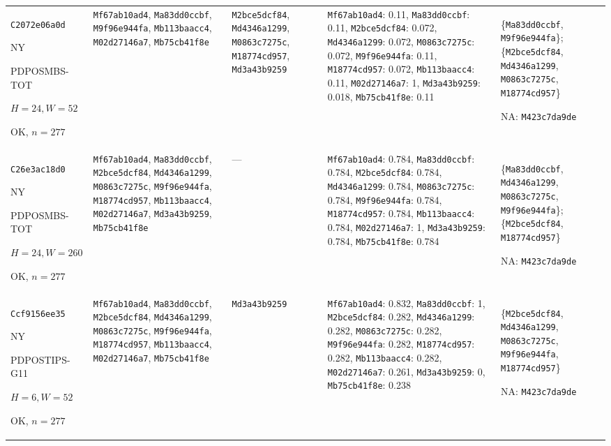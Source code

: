 \begin{longtable}{p{.15\linewidth}p{.17\linewidth}p{.17\linewidth}p{.25\linewidth}p{.14\linewidth}}
\texttt{C2072e06a0d}\par NY\par PDPOSMBS-\allowbreak{}TOT\par $H=24,W=52$\par OK, $n=277$ & \texttt{Mf67ab10ad4}, \texttt{Ma83dd0ccbf}, \texttt{M9f96e944fa}, \texttt{Mb113baacc4}, \texttt{M02d27146a7}, \texttt{Mb75cb41f8e} & \texttt{M2bce5dcf84}, \texttt{Md4346a1299}, \texttt{M0863c7275c}, \texttt{M18774cd957}, \texttt{Md3a43b9259} & \texttt{Mf67ab10ad4}: 0.11, \texttt{Ma83dd0ccbf}: 0.11, \texttt{M2bce5dcf84}: 0.072, \texttt{Md4346a1299}: 0.072, \texttt{M0863c7275c}: 0.072, \texttt{M9f96e944fa}: 0.11, \texttt{M18774cd957}: 0.072, \texttt{Mb113baacc4}: 0.11, \texttt{M02d27146a7}: 1, \texttt{Md3a43b9259}: 0.018, \texttt{Mb75cb41f8e}: 0.11 & \{\texttt{Ma83dd0ccbf}, \texttt{M9f96e944fa}\}; \{\texttt{M2bce5dcf84}, \texttt{Md4346a1299}, \texttt{M0863c7275c}, \texttt{M18774cd957}\}\par NA: \texttt{M423c7da9de} \\
\texttt{C26e3ac18d0}\par NY\par PDPOSMBS-\allowbreak{}TOT\par $H=24,W=260$\par OK, $n=277$ & \texttt{Mf67ab10ad4}, \texttt{Ma83dd0ccbf}, \texttt{M2bce5dcf84}, \texttt{Md4346a1299}, \texttt{M0863c7275c}, \texttt{M9f96e944fa}, \texttt{M18774cd957}, \texttt{Mb113baacc4}, \texttt{M02d27146a7}, \texttt{Md3a43b9259}, \texttt{Mb75cb41f8e} & --- & \texttt{Mf67ab10ad4}: 0.784, \texttt{Ma83dd0ccbf}: 0.784, \texttt{M2bce5dcf84}: 0.784, \texttt{Md4346a1299}: 0.784, \texttt{M0863c7275c}: 0.784, \texttt{M9f96e944fa}: 0.784, \texttt{M18774cd957}: 0.784, \texttt{Mb113baacc4}: 0.784, \texttt{M02d27146a7}: 1, \texttt{Md3a43b9259}: 0.784, \texttt{Mb75cb41f8e}: 0.784 & \{\texttt{Ma83dd0ccbf}, \texttt{Md4346a1299}, \texttt{M0863c7275c}, \texttt{M9f96e944fa}\}; \{\texttt{M2bce5dcf84}, \texttt{M18774cd957}\}\par NA: \texttt{M423c7da9de} \\
\texttt{Ccf9156ee35}\par NY\par PDPOSTIPS-\allowbreak{}G11\par $H=6,W=52$\par OK, $n=277$ & \texttt{Mf67ab10ad4}, \texttt{Ma83dd0ccbf}, \texttt{M2bce5dcf84}, \texttt{Md4346a1299}, \texttt{M0863c7275c}, \texttt{M9f96e944fa}, \texttt{M18774cd957}, \texttt{Mb113baacc4}, \texttt{M02d27146a7}, \texttt{Mb75cb41f8e} & \texttt{Md3a43b9259} & \texttt{Mf67ab10ad4}: 0.832, \texttt{Ma83dd0ccbf}: 1, \texttt{M2bce5dcf84}: 0.282, \texttt{Md4346a1299}: 0.282, \texttt{M0863c7275c}: 0.282, \texttt{M9f96e944fa}: 0.282, \texttt{M18774cd957}: 0.282, \texttt{Mb113baacc4}: 0.282, \texttt{M02d27146a7}: 0.261, \texttt{Md3a43b9259}: 0, \texttt{Mb75cb41f8e}: 0.238 & \{\texttt{M2bce5dcf84}, \texttt{Md4346a1299}, \texttt{M0863c7275c}, \texttt{M9f96e944fa}, \texttt{M18774cd957}\}\par NA: \texttt{M423c7da9de} \\

\end{longtable}
